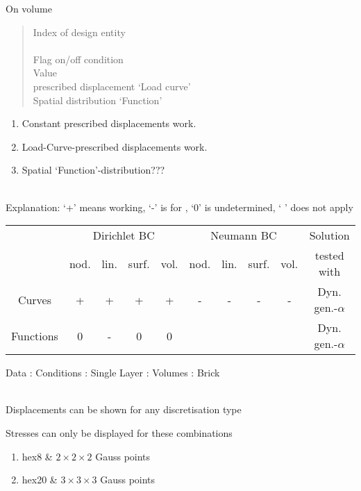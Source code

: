 On volume
\begin{quote}
 \cnl \chs Index of design entity\\
\cod{-} \cnl \\
 \cnl \chs Flag on/off condition \\
 \cnl \chs Value\\
 \cnl \chs prescribed displacement `Load curve'\\
 \chs Spatial distribution `Function'
\end{quote}
\begin{enumerate}
\item Constant prescribed displacements work.
\item Load-Curve-prescribed displacements work.
\item Spatial `Function'-distribution???
\end{enumerate}


\\
Explanation: `+' means working, `-' is for , `0' is undetermined, ` ' does not apply
\begin{center}
\begin{tabular}{c|cccc|cccc|c}
  & \multicolumn{4}{c|}{Dirichlet BC} & \multicolumn{4}{c|}{Neumann BC}
  & Solution
\\
  & nod. & lin. & surf. & vol.
  & nod. & lin. & surf. & vol.
  & tested with
\\ \hline
  Curves 
  & + & + & + & + 
  & - & - & - & - 
  & Dyn. gen.-$\alpha$
\\
  Functions 
  & 0 & - & 0 & 0
  &  &  & &
  & Dyn. gen.-$\alpha$
\end{tabular}
\end{center}

 Data : Conditions : Single Layer : Volumes : Brick

\\
Displacements can be shown for any discretisation type

Stresses can only be displayed for these combinations
\begin{enumerate}
\item hex8 \& $2\times2\times2$ Gauss points
\item hex20 \& $3\times3\times3$ Gauss points
\end{enumerate}

